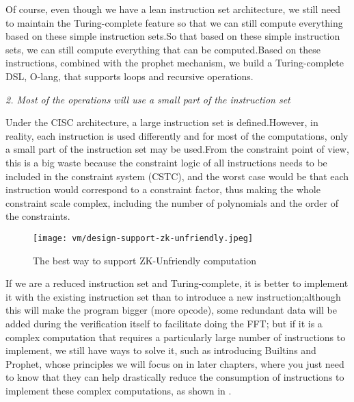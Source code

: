 Of course, even though we have a lean instruction set architecture, we still need to maintain the Turing-complete feature so that
we can still compute everything based on these simple instruction sets.So that based on these simple instruction sets, we can still
compute everything that can be computed.Based on these instructions, combined with the prophet mechanism, we build a Turing-complete
DSL, O-lang, that supports loops and recursive operations.

\emph{2. Most of the operations will use a small part of the instruction set}

Under the CISC architecture, a large instruction set is defined.However, in reality, each instruction is used differently and for most
of the computations, only a small part of the instruction set may be used.From the constraint point of view, this is a big waste because
the constraint logic of all instructions needs to be included in the constraint system (CSTC), and the worst case would be that each instruction
would correspond to a constraint factor, thus making the whole constraint scale complex, including the number of polynomials and the order of
the constraints.

\begin{figure}[!ht]
    \centering
    \texttt{[image: vm/design-support-zk-unfriendly.jpeg]}
    \caption{The best way to support ZK-Unfriendly computation}
    \label{fig:desgin-support-zk-unfriendly}
\end{figure}

If we are a reduced instruction set and Turing-complete, it is better to implement it with the existing instruction set than to introduce a new
instruction;although this will make the program bigger (more opcode), some redundant data will be added during the verification itself to
facilitate doing the FFT; but if it is a complex computation that requires a particularly large number of instructions to implement, we still
have ways to solve it, such as introducing Builtins and Prophet, whose principles we will focus on in later chapters, where you just need to
know that they can help drastically reduce the consumption of instructions to implement these complex computations, as shown in .
